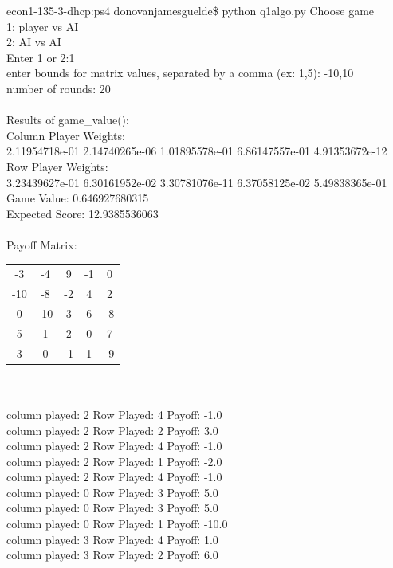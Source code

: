 \documentclass[11pt, oneside]{article}   	%
\begin{document}
econ1-135-3-dhcp:ps4 donovanjamesguelde\$ python q1algo.py
Choose game\\
1: player vs AI\\
2: AI vs AI\\
Enter 1 or 2:1\\
enter bounds for matrix values, separated by a comma (ex: 1,5): -10,10\\
number of rounds: 20\\
\\
Results of game\_value():\\
Column Player Weights:\\
\indent 2.11954718e-01   2.14740265e-06   1.01895578e-01   6.86147557e-01   4.91353672e-12\\
Row Player Weights:\\
\indent 3.23439627e-01   6.30161952e-02   3.30781076e-11   6.37058125e-02   5.49838365e-01\\
Game Value: 0.646927680315\\
Expected Score: 12.9385536063 \\
\\
Payoff Matrix:\\
\begin{tabular}{ c c c c c}
 -3  &-4  & 9 & -1  & 0\\
 -10 & -8 & -2 &  4  & 2\\
   0 &-10  & 3 &  6 & -8\\
   5  & 1  & 2  & 0  & 7\\
   3  & 0 & -1  & 1 & -9\\
\end{tabular}
\\
\\
column played: 2   Row Played: 4 Payoff: -1.0\\
column played: 2   Row Played: 2 Payoff: 3.0\\
column played: 2   Row Played: 4 Payoff: -1.0\\
column played: 2   Row Played: 1 Payoff: -2.0\\
column played: 2   Row Played: 4 Payoff: -1.0\\
column played: 0   Row Played: 3 Payoff: 5.0\\
column played: 0   Row Played: 3 Payoff: 5.0\\
column played: 0   Row Played: 1 Payoff: -10.0\\
column played: 3   Row Played: 4 Payoff: 1.0\\
column played: 3   Row Played: 2 Payoff: 6.0\\
\end{document}
